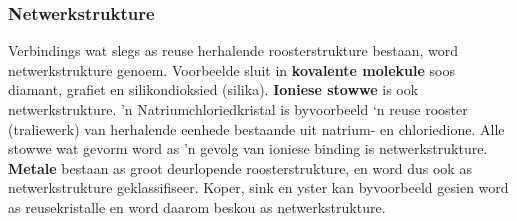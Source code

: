 \subsubsection*{Netwerkstrukture}
Verbindings wat slegs as reuse herhalende roosterstrukture bestaan, word netwerkstrukture genoem. Voorbeelde sluit in \textbf{kovalente molekule} soos diamant, grafiet en silikondioksied (silika). \textbf{Ioniese stowwe} is ook netwerkstrukture. 'n Natriumchloriedkristal is byvoorbeeld ‘n reuse rooster (traliewerk) van herhalende eenhede bestaande uit natrium- en chloriedione. Alle stowwe wat gevorm word as 'n gevolg van ioniese binding is netwerkstrukture. \textbf{Metale} bestaan as groot deurlopende roosterstrukture, en word dus ook as netwerkstrukture geklassifiseer. Koper, sink en yster kan byvoorbeeld gesien word as reusekristalle en word daarom beskou as netwerkstrukture.


